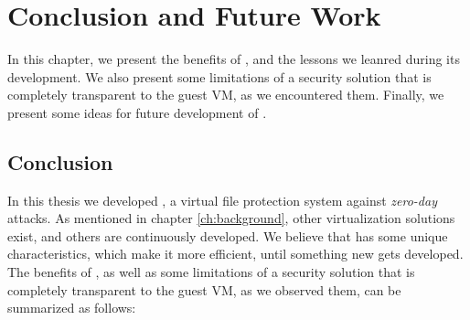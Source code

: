 
\chapter{Conclusion and Future Work}\label{ch:chapter5}

\par In this chapter, we present the benefits of , and the lessons we leanred during its development. We also present some limitations of a security solution that is completely transparent to the guest \ac{VM}, as we encountered them. Finally, we present some ideas for future development of .

\section{Conclusion}

\par In this thesis we developed , a virtual file protection system against \emph{zero-day} attacks. As mentioned in chapter \ref{ch:background}, other virtualization solutions exist, and others are continuously developed. We believe that  has some unique characteristics, which make it more efficient, until something new gets developed. The benefits of , as well as some limitations of a security solution that is completely transparent to the guest \ac{VM}, as we observed them, can be summarized as follows:

